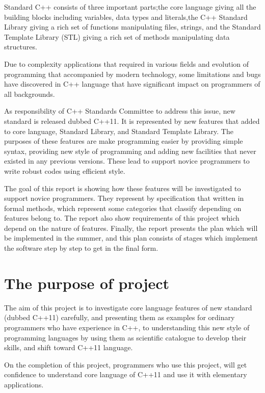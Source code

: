 \documentclass[11pt]{report}
\begin{document}
Standard C++ consists of three important parts;the core language giving all the building blocks including variables, data types and literals,the C++ Standard Library giving a rich set of functions manipulating files, strings, and the Standard Template Library (STL) giving a rich set of methods manipulating data structures.

Due to complexity applications  that required in various fields and evolution of programming that  accompanied by modern technology, some limitations and bugs have discovered in C++ language that have significant impact on programmers of all backgrounds.

As responsibility of C++ Standards Committee to address this issue, new standard is released dubbed C++11. It is represented by new features that added to core language, Standard  Library, and Standard Template Library. The purposes of these features are make programming easier by providing simple syntax, providing new style of programming and adding new facilities that never existed in any previous versions. These lead to support novice programmers to write robust codes using efficient style.

The goal of this report is showing how these features will be investigated to support novice programmers. They represent by specification that written in formal methods, which represent some categories that  classify depending on features belong to. The report also show requirements of this project which depend on the nature of features. Finally, the report presents the plan which will be implemented in the summer, and this plan consists of stages which implement the software step by step to get in the final form.


\section{The purpose of project}
\label{section:The purpose of project}
The aim of this project is to investigate core language  features of new standard (dubbed C++11) carefully, and presenting them as examples for ordinary programmers who have experience in C++, to understanding this new style of programming languages by using them as scientific  catalogue to develop their skills, and shift toward C++11 language.

On the completion of this project, programmers who use this project, will get confidence to understand core language of  C++11 and use it with elementary applications.
\end{document}
